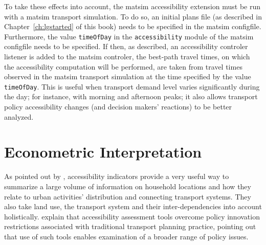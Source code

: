 To take these effects into account, the \gls{matsim} accessibility extension must be run with a \gls{matsim} 
transport simulation. To do so, an initial plans file (as described in Chapter~\ref{ch:lgstarted} of this book) 
needs to be specified in the \gls{matsim} \gls{configfile}. Furthermore, the value \lstinline{timeOfDay} in
the \lstinline{accessibility} module of the \gls{matsim} \gls{configfile} needs to be specified. If then, as 
described, an accessibility controler listener is added to the \gls{matsim} controler, the best-path travel
times, on which the accessibility computation will be performed, are taken from travel times observed in
the \gls{matsim} transport simulation at the time specified by the value \lstinline{timeOfDay}. This is useful 
when transport demand level varies significantly during the day; for instance, 
with morning and afternoon peaks; it also allows transport policy accessibility changes 
(and decision makers' reactions) to be better analyzed.

\section{Econometric Interpretation}
As pointed out by \citet{MorrisEtAl1979AccessibilityIndicators}, accessibility indicators provide a very
useful way to summarize a large volume of information on household locations and how they relate to 
urban activities' distribution and connecting transport systems.
%
%
They also take land use, the transport system and their inter-dependencies into
account holistically.
%
%
\citet{CurtisEtAl2013AccessibilityPolicyInnovation} explain that accessibility assessment tools overcome
policy innovation restrictions associated with traditional transport planning practice, pointing out that use of
such tools enables examination of a broader range of policy issues.

